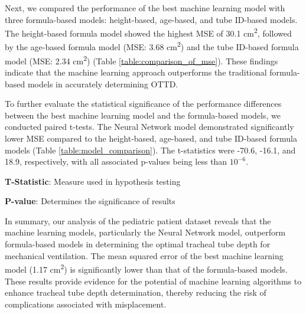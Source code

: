 \documentclass[11pt]{article}
\begin{document}
Next, we compared the performance of the best machine learning model with three formula-based models: height-based, age-based, and tube ID-based models. The height-based formula model showed the highest MSE of 30.1 cm\textsuperscript{2}, followed by the age-based formula model (MSE: 3.68 cm\textsuperscript{2}) and the tube ID-based formula model (MSE: 2.34 cm\textsuperscript{2}) (Table {}\ref{table:comparison_of_mse}). These findings indicate that the machine learning approach outperforms the traditional formula-based models in accurately determining OTTD.

To further evaluate the statistical significance of the performance differences between the best machine learning model and the formula-based models, we conducted paired t-tests. The Neural Network model demonstrated significantly lower MSE compared to the height-based, age-based, and tube ID-based formula models (Table {}\ref{table:model_comparison}). The t-statistics were -70.6, -16.1, and 18.9, respectively, with all associated p-values being less than $10^{-6}$.

\begin{table}[h]
\caption{Paired T-Statistic and P-Value for Comparison of Models}
\label{table:model_comparison}
\begin{threeparttable}
\renewcommand{\TPTminimum}{\linewidth}
\begin{tablenotes}
\footnotesize
\item \textbf{T-Statistic}: Measure used in hypothesis testing
\item \textbf{P-value}: Determines the significance of results
\end{tablenotes}
\end{threeparttable}
\end{table}


In summary, our analysis of the pediatric patient dataset reveals that the machine learning models, particularly the Neural Network model, outperform formula-based models in determining the optimal tracheal tube depth for mechanical ventilation. The mean squared error of the best machine learning model (1.17 cm\textsuperscript{2}) is significantly lower than that of the formula-based models. These results provide evidence for the potential of machine learning algorithms to enhance tracheal tube depth determination, thereby reducing the risk of complications associated with misplacement.
\end{document}
